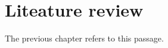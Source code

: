 
\chapter{Liteature review}
The previous chapter refers to this passage\label{sec:discussion-example}.
